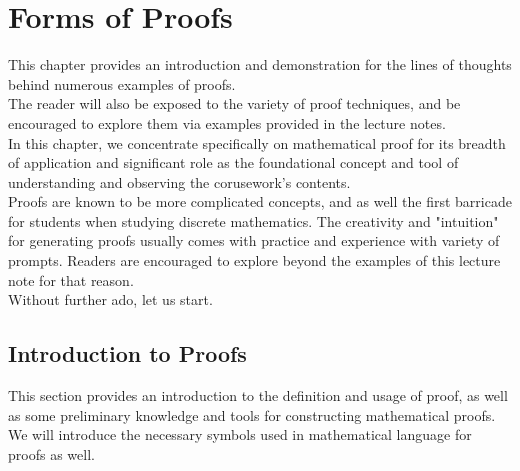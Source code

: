 \chapter{Forms of Proofs}
This chapter provides an introduction and demonstration for the lines of thoughts behind numerous examples of proofs. \\
The reader will also be exposed to the variety of proof techniques, and be encouraged to explore them via examples provided in the lecture notes. \\
In this chapter, we concentrate specifically on mathematical proof for its breadth of application and significant role as the foundational concept and tool of understanding and observing the corusework's contents. \\
Proofs are known to be more complicated concepts, and as well the first barricade for students when studying discrete mathematics. The creativity and "intuition" for generating proofs usually comes with practice and experience with variety of prompts. Readers are encouraged to explore beyond the examples of this lecture note for that reason. \\
Without further ado, let us start.

\section{Introduction to Proofs}
This section provides an introduction to the definition and usage of proof, as well as some preliminary knowledge and tools for constructing mathematical proofs. We will introduce the necessary symbols used in mathematical language for proofs as well.

